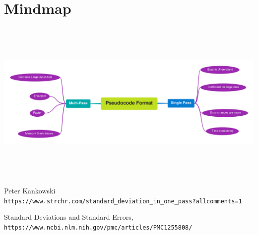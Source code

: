 \documentclass[11pt]{report}
\begin{document}
\section{Mindmap}
\begin{center}
\includegraphics[width=15cm,height=8cm]{Mindmap}
\end{center}


\begin{thebibliography}{9}
Peter Kankowski
\\\texttt{https://www.strchr.com/standard\_deviation\_in\_one\_pass?allcomments=1}

Standard Deviations and Standard Errors,
\\\texttt{https://www.ncbi.nlm.nih.gov/pmc/articles/PMC1255808/}


\end{thebibliography}
\end{document}
